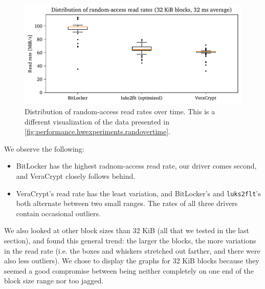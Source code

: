 \begin{figure}[htb!]
	\center
	\includegraphics[scale=1]{../fig/performance.hwexperiments.randovertimebox.pdf}
	\caption[
		Distribution of random-access read rates over time
	]{
		Distribution of random-access read rates over time. This is a different visualization of the data presented in \autoref{fig:performance.hwexperiments.randovertime}.
	}
	\label{fig:performance.hwexperiments.randovertimebox}
\end{figure}

We observe the following:
\begin{itemize}[beginpenalty=10000]
	\item BitLocker has the highest radnom-access read rate, our driver comes second, and VeraCrypt closely follows behind.
	\item VeraCrypt's read rate has the least variation, and BitLocker's and \texttt{luks2flt}'s both alternate between two small ranges. The rates of all three drivers contain occasional outliers.
\end{itemize}

We also looked at other block sizes than 32 KiB (all that we tested in the last section), and found this general trend: the larger the blocks, the more variations in the read rate (i.e. the boxes and whiskers stretched out farther, and there were also less outliers). We chose to display the graphs for 32 KiB blocks because they seemed a good compromise between being neither completely on one end of the block size range nor too jagged.

